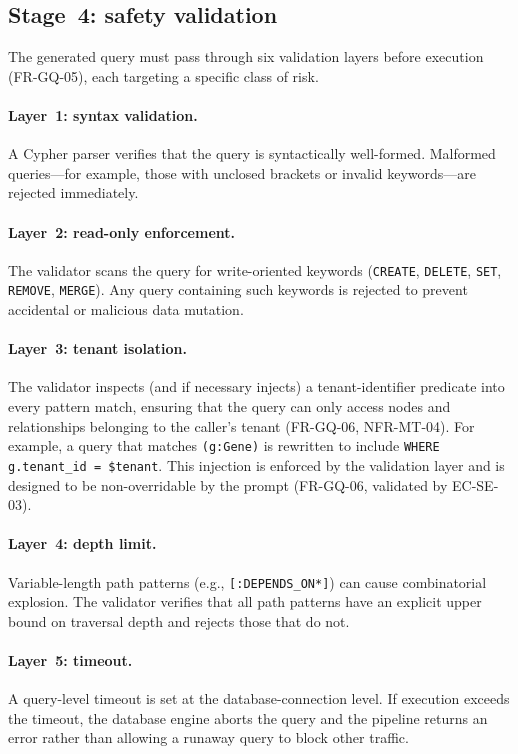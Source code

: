 \documentclass[a4paper]{sapthesis}
\begin{document}
\subsection{Stage~4: safety validation}

The generated query must pass through six validation layers before
execution (FR-GQ-05), each targeting a specific class of risk.

\paragraph{Layer~1: syntax validation.}
A Cypher parser verifies that the query is syntactically well-formed.
Malformed queries---for example, those with unclosed brackets or invalid
keywords---are rejected immediately.

\paragraph{Layer~2: read-only enforcement.}
The validator scans the query for write-oriented keywords
(\texttt{CREATE}, \texttt{DELETE}, \texttt{SET}, \texttt{REMOVE},
\texttt{MERGE}).  Any query containing such keywords is rejected to
prevent accidental or malicious data mutation.

\paragraph{Layer~3: tenant isolation.}
The validator inspects (and if necessary injects) a tenant-identifier
predicate into every pattern match, ensuring that the query can only
access nodes and relationships belonging to the caller's tenant
(FR-GQ-06, NFR-MT-04).  For example, a query that matches
\texttt{(g:Gene)} is rewritten to include
\texttt{WHERE g.tenant\_id = \$tenant}.  This injection is enforced by
the validation layer and is designed to be non-overridable by the prompt
(FR-GQ-06, validated by EC-SE-03).

\paragraph{Layer~4: depth limit.}
Variable-length path patterns (e.g., \texttt{[:DEPENDS\_ON*]}) can cause
combinatorial explosion.  The validator verifies that all path patterns
have an explicit upper bound on traversal depth and rejects those that do
not.

\paragraph{Layer~5: timeout.}
A query-level timeout is set at the database-connection level.  If
execution exceeds the timeout, the database engine aborts the query and
the pipeline returns an error rather than allowing a runaway query to
block other traffic.
\end{document}
